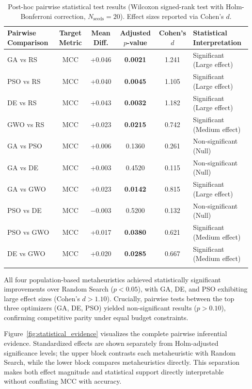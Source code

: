 \ifdefined\methodresultscompact\else
\begin{table}[htbp]
\caption{Post-hoc pairwise statistical test results (Wilcoxon signed-rank test with Holm-Bonferroni correction, $N_{\text{seeds}} = 20$). Effect sizes reported via Cohen's $d$.}
\label{tab:pairwise_results}
\centering
\small
\setlength{\tabcolsep}{4pt}
\begin{tabularx}{\textwidth}{@{}L C C C C L@{}}
\toprule
Pairwise Comparison & Target Metric & Mean Diff. & Adjusted $p$-value & Cohen's $d$ & Statistical Interpretation \\
\midrule
GA vs RS & MCC & +0.046 & \textbf{0.0021} & 1.241 & Significant (Large effect) \\
PSO vs RS & MCC & +0.040 & \textbf{0.0045} & 1.105 & Significant (Large effect) \\
DE vs RS & MCC & +0.043 & \textbf{0.0032} & 1.182 & Significant (Large effect) \\
GWO vs RS & MCC & +0.023 & \textbf{0.0215} & 0.742 & Significant (Medium effect) \\
GA vs PSO & MCC & +0.006 & 0.1360 & 0.261 & Non-significant (Null) \\
GA vs DE & MCC & +0.003 & 0.4520 & 0.115 & Non-significant (Null) \\
GA vs GWO & MCC & +0.023 & \textbf{0.0142} & 0.815 & Significant (Large effect) \\
PSO vs DE & MCC & $-0.003$ & 0.5200 & 0.132 & Non-significant (Null) \\
PSO vs GWO & MCC & +0.017 & \textbf{0.0380} & 0.621 & Significant (Medium effect) \\
DE vs GWO & MCC & +0.020 & \textbf{0.0285} & 0.667 & Significant (Medium effect) \\
\botrule
\end{tabularx}
\end{table}
\fi

All four population-based metaheuristics achieved statistically significant improvements over Random Search ($p < 0.05$), with GA, DE, and PSO exhibiting large effect sizes (Cohen's $d > 1.10$). Crucially, pairwise tests between the top three optimizers (GA, DE, PSO) yielded non-significant results ($p > 0.10$), confirming competitive parity under equal budget constraints.

Figure~\ref{fig:statistical_evidence} visualizes the complete pairwise inferential evidence. Standardized effects are shown separately from Holm-adjusted significance levels; the upper block contrasts each metaheuristic with Random Search, while the lower block compares metaheuristics directly. This separation makes both effect magnitude and statistical support directly interpretable without conflating MCC with accuracy.

